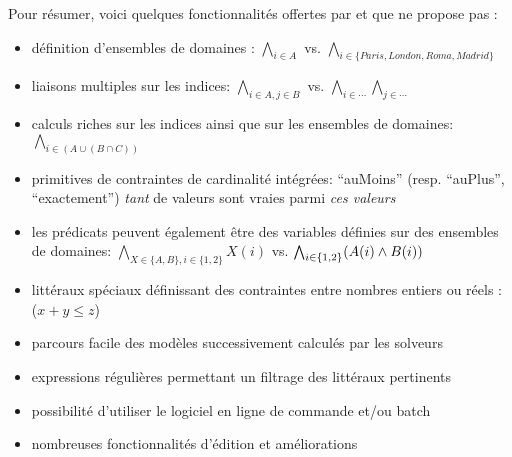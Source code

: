 Pour résumer, voici quelques fonctionnalités offertes par \touist et que \satoulouse ne propose pas :
\begin{itemize}
\item définition d'ensembles de domaines : $\bigwedge_{i\in A}$ vs. $\bigwedge_{i\in\{Paris,London,Roma,Madrid\}}$
\item liaisons multiples sur les indices: $\bigwedge_{i\in A,j\in B}$ vs. $\bigwedge_{i\in \cdots} \bigwedge_{j\in \cdots}$
\item calculs riches sur les indices ainsi que sur les ensembles de domaines: $\bigwedge_{i\in (A\cup (B \cap C))}$
\item primitives de contraintes de cardinalité intégrées: \enquote{auMoins} (resp. \enquote{auPlus}, \enquote{exactement}) \emph{tant} de valeurs sont vraies parmi \emph{ces valeurs}
\item les prédicats peuvent également être des variables définies sur des ensembles de domaines: $\bigwedge_{X\in \{A,B\},i\in \{1,2\}} X(i)$ vs. $\bigwedge_{i\in \{1,2\}} (A(i)\wedge B(i))$
\item littéraux spéciaux définissant des contraintes entre nombres entiers ou réels : ($x+y\leq z$)
\item parcours facile des modèles successivement calculés par les solveurs
\item expressions régulières permettant un filtrage des littéraux pertinents
\item possibilité d'utiliser le logiciel en ligne de commande et/ou batch
\item nombreuses fonctionnalités d'édition et améliorations
\end{itemize}
